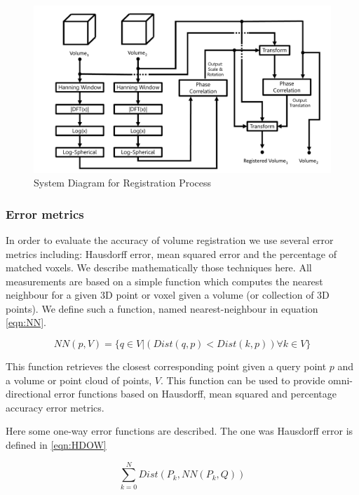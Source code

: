 \begin{figure}[!htb]
\centering
\includegraphics[width=6.0in]{images/ch2/pipeline2}
\caption{System Diagram for Registration Process}
\label{fig:PIPELINE}
\end{figure}


\subsubsection{Error metrics}

\label{metricsSection}

In order to evaluate the accuracy of volume registration we use several error metrics including: Hausdorff error, mean squared error and the percentage of matched voxels. We describe mathematically those techniques here. All measurements are based on a simple function which computes the nearest neighbour for a given 3D point or voxel given a volume (or collection of 3D points). We define such a function, named nearest-neighbour in equation \ref{eqn:NN}.

\begin{equation} \label{eqn:NN}
NN(p, V) =  \{ q \in V | (Dist(q, p) < Dist(k, p))  \forall k \in V \}
\end{equation}

This function retrieves the closest corresponding point given a query point $p$ and a volume or point cloud of points, $V$. This function can be used to provide omni-directional error functions based on Hausdorff, mean squared and percentage accuracy error metrics.

Here some one-way error functions are described. The one was Hausdorff error is defined in \ref{eqn:HDOW} 

\begin{equation} \label{eqn:HDOW}
\sum_{k=0}^{N} Dist(P_k, NN(P_k, Q))
\end{equation}

